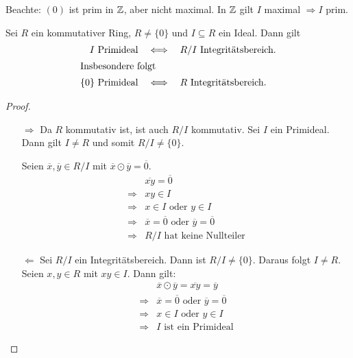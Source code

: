 \documentclass[12pt,a4paper]{scrartcl}
\begin{document}
\begin{bem}
	Beachte: $(0)$ ist prim in $\mathbb Z$, aber nicht maximal. In $\mathbb Z$ gilt \glqq$I$ maximal $\Rightarrow I $ prim\grqq.
\end{bem}


\begin{satz} \label{thm:primitb}
	Sei $R$ ein kommutativer Ring, $R\neq\{0\}$ und $ I\subseteq R$ ein Ideal. Dann gilt
	\begin{align*} I \text{ Primideal} \quad &\Longleftrightarrow \quad R/I \text{ Integritätsbereich}. \\\intertext{Insbesondere folgt}
	 \text{$\{0\}$ Primideal} \quad&\Longleftrightarrow\quad \text{$R$ Integritätsbereich}.\end{align*}
\end{satz}

\begin{proof}
	\leavevmode
	\begin{itemize}
		\item[\glqq $\Rightarrow$\grqq] Da $R$ kommutativ ist, ist auch $R/I$ kommutativ.
		Sei $I$ ein Primideal. Dann gilt $I\neq R$ und somit $R/I \neq\{0\}$. 
		
		Seien $\overline{x}, \overline{y}\in R/I$ mit  $\overline{x}\odot\overline{y} = \overline{0}$.
		\begin{align*}
			&\overline{xy} = \overline{0} \\
			\Rightarrow& xy\in I \\
			\Rightarrow& x\in I \text{ oder } y\in I \\
			\Rightarrow& \overline{x} = \overline{0} \text{ oder } \overline{y} = \overline{0} \\
			\Rightarrow& R/I \text{ hat keine Nullteiler}
		\end{align*}
		
		\item[\glqq$\Leftarrow$\grqq] Sei $R/I$ ein Integritätsbereich. Dann ist $R/I \neq \{0\}$. Daraus folgt $I \neq R$. Seien $x,y\in R$ mit $xy\in I$. Dann gilt:
		\begin{align*}
			&\overline{x}\odot\overline{y} = \overline{xy} = \overline{y} \\
			\Rightarrow& \overline{x} = \overline{0} \text{ oder } \overline{y} = \overline{0} \\
			\Rightarrow& x\in I \text{ oder } y\in I \\
			\Rightarrow& I \text{ ist ein Primideal}
		\end{align*}
	\end{itemize}
\end{proof}
\end{document}
